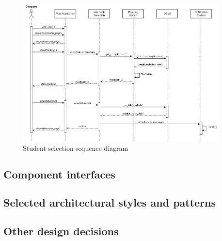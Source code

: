\documentclass[11pt,twoside]{article}
\begin{document}
\begin{figure}[H]
\centering
\includegraphics[width=0.95\textwidth]{Images/Seq8}
\caption{Student selection sequence diagram}\label{Seq8}
\end{figure}

\newpage
	
	\subsection{Component interfaces}
	
	\subsection{Selected architectural styles and patterns}
	
	\subsection{Other design decisions}

\newpage
\end{document}
